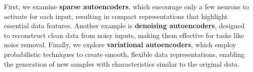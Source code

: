 \documentclass{article}
\begin{document}
First, we examine \textbf{sparse autoencoders}, which encourage only a few neurons to activate for each input, resulting in compact representations that highlight essential data features. Another example is \textbf{denoising autoencoders}, designed to reconstruct clean data from noisy inputs, making them effective for tasks like noise removal. Finally, we explore \textbf{variational autoencoders}, which employ probabilistic techniques to create smooth, flexible data representations, enabling the generation of new samples with characteristics similar to the original data.






    
        
\end{document}
